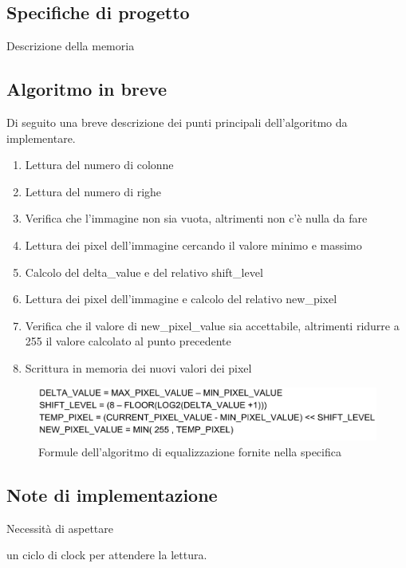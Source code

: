 \documentclass{article}
\begin{document}
\subsection{Specifiche di progetto}
Descrizione della memoria

\subsection{Algoritmo in breve}
Di seguito una breve descrizione dei punti principali dell'algoritmo da implementare.

\begin{enumerate}
    \item Lettura del numero di colonne
    \item Lettura del numero di righe
    \item Verifica che l'immagine non sia vuota, altrimenti non c'è nulla da fare
    \item Lettura dei pixel dell'immagine cercando il valore minimo e massimo
    \item Calcolo del delta\_value e del relativo shift\_level
    \item Lettura dei pixel dell'immagine e calcolo del relativo new\_pixel
    \item Verifica che il valore di new\_pixel\_value sia accettabile, altrimenti ridurre a 255 il valore calcolato al punto precedente
    \item Scrittura in memoria dei nuovi valori dei pixel
\end{enumerate}

\begin{figure}[h]
    \includegraphics[width=\textwidth]{formulas.png}
    \centering
    \caption{Formule dell'algoritmo di equalizzazione fornite nella specifica}
\end{figure}

\subsection{Note di implementazione}
Necessità di aspettare \par
un ciclo di clock per attendere la lettura.


\pagebreak
{}
\end{document}
